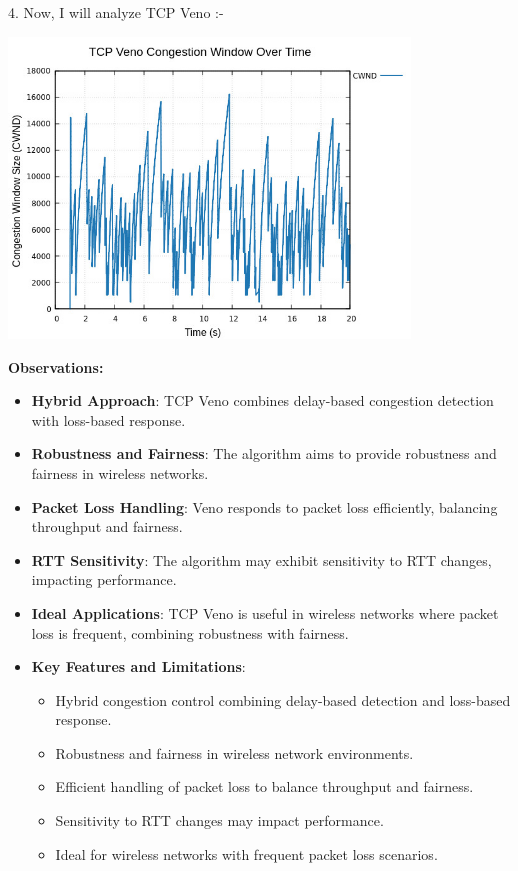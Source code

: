 \documentclass[11pt,a4paper]{article}
\begin{document}
4. Now, I will analyze TCP Veno :-
\begin{center}
    \includegraphics[width=0.8\textwidth]{images/veno_cwnd.jpg}
\end{center}

\textbf{Observations:}
\begin{itemize}
    \item \textbf{Hybrid Approach}: TCP Veno combines delay-based congestion detection with loss-based response.
    \item \textbf{Robustness and Fairness}: The algorithm aims to provide robustness and fairness in wireless networks.
    \item \textbf{Packet Loss Handling}: Veno responds to packet loss efficiently, balancing throughput and fairness.
    \item \textbf{RTT Sensitivity}: The algorithm may exhibit sensitivity to RTT changes, impacting performance.
    \item \textbf{Ideal Applications}: TCP Veno is useful in wireless networks where packet loss is frequent, combining robustness with fairness.
    \item   \textbf{Key Features and Limitations}: {
        \begin{itemize}
            \item Hybrid congestion control combining delay-based detection and loss-based response.
            \item Robustness and fairness in wireless network environments.
            \item Efficient handling of packet loss to balance throughput and fairness.
            \item Sensitivity to RTT changes may impact performance.
            \item Ideal for wireless networks with frequent packet loss scenarios.
        \end{itemize}
    }
\end{itemize}
\end{document}
